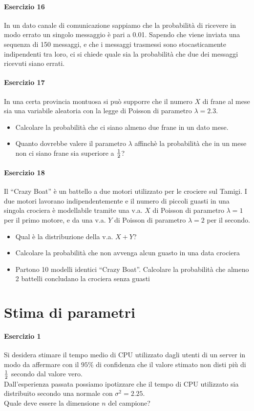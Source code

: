 \documentclass[12pt]{article}
\begin{document}
    \paragraph{Esercizio 16}
    In un dato canale di comunicazione sappiamo che la probabilità di ricevere in modo errato un singolo messaggio è pari a 0.01. Sapendo che viene inviata una sequenza di 150 messaggi, e che i messaggi trasmessi sono stocasticamente indipendenti tra loro, ci si chiede quale sia la probabilità che due dei messaggi ricevuti siano errati.
    \newpage
    \paragraph{Esercizio 17}
    In una certa provincia montuosa si può supporre che il numero $X$ di frane al mese sia una variabile aleatoria con la legge di Poisson di parametro $\lambda=2.3$.
    \begin{itemize}
        \item Calcolare la probabilità che ci siano almeno due frane in un dato mese.
        \item Quanto dovrebbe valere il parametro $\lambda$ affinchè la probabilità che in un mese non ci siano frane sia superiore a $1 \over 2$?
    \end{itemize}
    \paragraph{Esercizio 18}
    Il “Crazy Boat” è un battello a due motori utilizzato per le crociere sul Tamigi. I due motori lavorano indipendentemente e il numero di piccoli guasti in una singola crociera è modellabile tramite una v.a. $X$ di Poisson di parametro $\lambda=1$ per il primo motore, e da una v.a. $Y$ di Poisson di parametro $\lambda=2$ per il secondo.
    \begin{itemize}
        \item Qual è la distribuzione della v.a. $X+Y$?
        \item Calcolare la probabilità che non avvenga alcun guasto in una data crociera
        \item Partono 10 modelli identici “Crazy Boat”. Calcolare la probabilità che almeno 2 battelli concludano la crociera senza guasti
    \end{itemize}
    \newpage
    \section{Stima di parametri}
    \paragraph{Esercizio 1} 
    Si desidera stimare il tempo medio di CPU utilizzato dagli utenti di un server in modo da affermare con il $95\%$ di confidenza che il valore stimato non disti più di $1 \over 2$ secondo dal valore vero.
    \\Dall’esperienza passata possiamo ipotizzare che il tempo di CPU utilizzato sia distribuito secondo una normale con $\sigma^2=2.25$.
    \\Quale deve essere la dimensione $n$ del campione?
\end{document}
